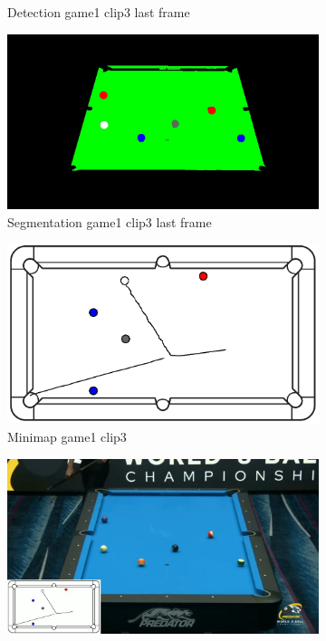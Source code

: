 \begin{figure}[H]
\begin{subfigure}[b]{0.48\textwidth}
        \caption{Detection game1 clip3 last frame}
        \label{fig: game1_clip3_last_frame_detected}
    \end{subfigure}
    \begin{subfigure}[b]{0.48\textwidth}
        \centering
        \includegraphics[width=\textwidth]{images/Segmentation/game1_clip3_segmented_balls_last_frame.jpg}
        \caption{Segmentation game1 clip3 last frame}
		\label{fig: game1_clip3_last_frame_segmented}
    \end{subfigure}
    \begin{subfigure}[b]{0.48\textwidth}
    	\centering
    	\includegraphics[width=\textwidth]{images/AllMinimap/game1_clip3_minimap.png}
    	\caption{Minimap game1 clip3}
    	\label{fig: game1_clip3_minimap}
    \end{subfigure}
    \begin{subfigure}[b]{0.48\textwidth}
    	\centering
    	\includegraphics[width=\textwidth]{images/Video/game1_clip3_video.jpg}

\end{subfigure}
\end{figure}

